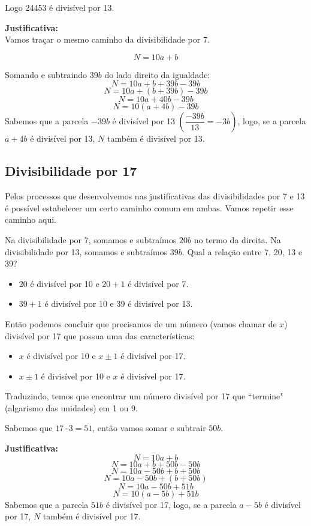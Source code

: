 \documentclass[12pt,a4paper]{article}
\begin{document}
		Logo 24453 é divisível por 13.
		
		\textbf{Justificativa:}\\
        Vamos traçar o mesmo caminho da divisibilidade por 7.

		$$N = 10a + b$$
		
		Somando e subtraindo $39b$ do lado direito da igualdade:		
		$$N = 10  a + b + 39b - 39b$$
		$$N = 10  a + (b + 39b) - 39b$$
		$$N = 10  a + 40b - 39b$$
		$$N = 10  (a + 4b) - 39b$$		
		Sabemos que a parcela $-39b$ é divisível por 13 $\left(  \dfrac{-39b}{13} = -3b \right) $, logo, se a parcela $a + 4b$ é divisível por 13, $N$ também é divisível por 13.
		
		\newpage

		\subsection{Divisibilidade por 17}
        Pelos processos que desenvolvemos nas justificativas das divisibilidades por 7 e 13 é possível estabelecer um certo caminho comum em ambas. Vamos repetir esse caminho aqui.

        Na divisibilidade por 7, somamos e subtraímos $20b$ no termo da direita. Na divisibilidade por 13, somamos e subtraímos $39b$. Qual a relação entre 7, 20, 13 e 39?
        \begin{itemize}
            \item 20 é divisível por 10 e $20+1$ é divisível por 7.
		    \item $39+1$ é divisível por 10 e 39 é divisível por 13.
        \end{itemize}
        Então podemos concluir que precisamos de um número (vamos chamar de $x$) divisível por 17 que possua uma das características:
		\begin{itemize}
            \item $x$ é divisível por 10 e $x \pm 1$ é divisível por 17.
		    \item $x\pm 1$ é divisível por 10 e $x$ é divisível por 17.
        \end{itemize}
        Traduzindo, temos que encontrar um número divisível por 17 que ``termine" (algarismo das unidades) em 1 ou 9.

        Sabemos que $17 \cdot 3 = 51$, então vamos somar e subtrair $50b$.

        \textbf{Justificativa:}
		$$N = 10a + b$$
		$$N = 10  a + b + 50b - 50b$$
		$$N = 10  a - 50b + b + 50b$$
        $$N = 10  a - 50b + ( b + 50b)$$
		$$N = 10  a - 50b + 51b$$
		$$N = 10  (a -5b) + 51b$$		
		Sabemos que a parcela $51b$ é divisível por 17, logo, se a parcela $a - 5b$ é divisível por 17, $N$ também é divisível por 17.
\end{document}
